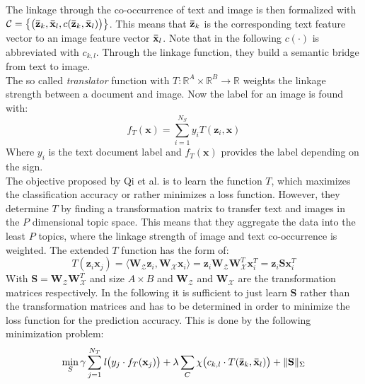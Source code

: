 The linkage through the co-occurrence of text and image is then formalized with $\mathcal{C} = \big\{\big( \mathbf{\bar{z}}_k,\mathbf{\bar{x}}_l,c( \mathbf{\bar{z}}_k,\mathbf{\bar{x}}_l) \big)\big\}$.
This means that $\mathbf{\bar{z}}_k$ is the corresponding text feature vector to an image feature vector $\mathbf{\bar{x}}_l$.
Note that in the following $c(\cdot)$ is abbreviated with $c_{k,l}$.
Through the linkage function, they build a semantic bridge from text to image.\cite{Qi.2011}\\
The so called \textit{translator} function with $T : \mathbb{R}^A \times \mathbb{R}^B \to \mathbb{R}$ weights the linkage strength between a document and image.
Now the label for an image is found with:\cite{Qi.2011}
\begin{equation}
	f_T (\mathbf{x}) = \sum_{i=1}^{N_S} y_i T(\mathbf{z}_i,\mathbf{x})
\end{equation}
Where $y_i$ is the text document label and     $f_T (\mathbf{x})$ provides the label depending on the sign.\\
The objective proposed by Qi et al. is to learn the function $T$, which maximizes the classification accuracy or rather minimizes a loss function. However, they determine $T$ by finding a transformation matrix to transfer text and images in the $P$ dimensional topic space. This means that they aggregate the data into the least $P$ topics, where the linkage strength of image and text co-occurrence is weighted. The extended $T$ function has the form of:\cite{Qi.2011}
\begin{equation}
T(\mathbf{z}_i\mathbf{x}_j) = \langle \mathbf{W}_\mathcal{Z}\mathbf{z}_i,\mathbf{W}_\mathcal{X}\mathbf{x}_i\rangle = \mathbf{z}_i \mathbf{W}_\mathcal{Z}\mathbf{W}_\mathcal{X}^T\mathbf{x}_i^T = \mathbf{z}_i\mathbf{S}\mathbf{x}_i^T 
\end{equation}
With $\mathbf{S} = \mathbf{W}_\mathcal{Z}\mathbf{W}_\mathcal{X}^T$ and size $A \times B$ and $\mathbf{W}_\mathcal{Z}$ and $\mathbf{W}_\mathcal{X}$ are the transformation matrices respectively.
In the following it is sufficient to just learn $\mathbf{S}$ rather than the transformation matrices and has to be determined in order to minimize the loss function for the prediction accuracy. This is done by the following minimization problem:
\begin{equation}\label{EqTTIGeneralOpt}
\min_{S} \gamma \sum_{j=1}^{N_T}\mathit{l}\big( y_j \cdot f_T(\mathbf{x}_j) \big) + \lambda \sum_{C}  \chi \big( c_{k,l} \cdot T(\mathbf{\bar{z}}_k,\mathbf{\bar{x}}_l)\big) + \Vert \mathbf{S}\Vert_\Sigma
\end{equation}
